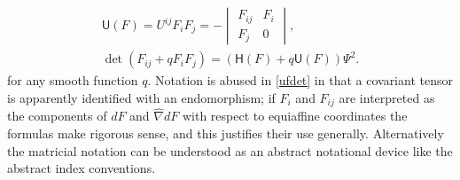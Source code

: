 \documentclass [leqno, 10pt]{amsart}
\theoremstyle{definition}
\numberwithin{equation}{section}
\newcommand{\U}{\mathsf{U}}
\renewcommand{\H}{\mathsf{H}}
\newcommand{\hnabla}{\widehat{\nabla}}
\begin{document}
\begin{align}
\label{ufdet}
&\U(F) = U^{ij}F_{i}F_{j} = -\begin{vmatrix} F_{ij} & F_{i} \\ F_{j} & 0 \end{vmatrix},& \\
\label{fdet}
&\det(F_{ij} + qF_{i}F_{j}) = (\H(F) + q\U(F))\Psi^{2}.
\end{align}
for any smooth function $q$. Notation is abused in \eqref{ufdet} in that a covariant tensor is apparently identified with an endomorphism; if $F_{i}$ and $F_{ij}$ are interpreted as the components of $dF$ and $\hnabla dF$ with respect to equiaffine coordinates the formulas make rigorous sense, and this justifies their use generally. Alternatively the matricial notation can be understood as an abstract notational device like the abstract index conventions. 
\end{document}
